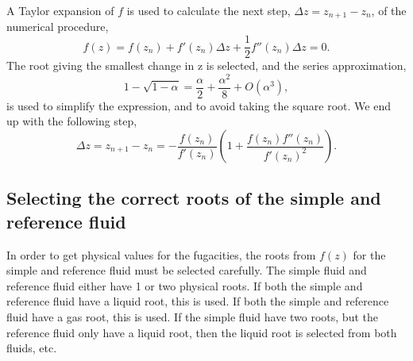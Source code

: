 \documentclass[english]{../thermomemo/thermomemo}
\numberwithin{equation}{section}
\begin{document}
A Taylor expansion of $f$ is used to calculate the next step, $\Delta
z = z_{n+1} - z_n $, of the numerical procedure,
\begin{equation}
\label{eq:LK_z_fun_taylor}
f(z) = f(z_n) + f'(z_n)\Delta z + \frac{1}{2}f''(z_n)\Delta z = 0.
\end{equation}
The root giving the smallest change in z is selected, and the
series approximation,
\begin{equation}
\label{eq:LK_sqrt_series}
1 - \sqrt{1 - \alpha} = \frac{\alpha}{2} + \frac{\alpha^2}{8} + O(\alpha^3),
\end{equation}
is used to simplify the expression, and to avoid taking the square
root. We end up with the following step,
\begin{equation}
\label{eq:LK_z_step}
\Delta z = z_{n+1} - z_{n} = - \frac{f(z_{n})}{f'(z_{n})}\left(1+\frac{f(z_{n})f''(z_{n})}{f'(z_{n})^2}\right).
\end{equation}

\subsection{Selecting the correct roots of the simple and reference fluid}
In order to get physical values for the fugacities, the roots from
$f(z)$ for the simple and reference fluid must be selected
carefully. The simple fluid and reference fluid either have 1 or two
physical roots. If both the simple and reference fluid have a liquid
root, this is used. If both the simple and reference fluid have a gas
root, this is used. If the simple fluid have two roots, but the
reference fluid only have a liquid root, then the liquid root is
selected from both fluids, etc. 
\end{document}
